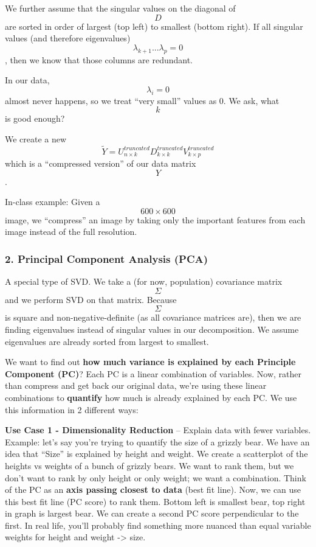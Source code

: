 We further assume that the singular values on the diagonal of \[D\] are
sorted in order of largest (top left) to smallest (bottom right). If all
singular values (and therefore eigenvalues)
\[\lambda_{k + 1}...\lambda_p = 0\], then we know that those columns are
redundant.

In our data, \[\lambda_i = 0\] almost never happens, so we treat ``very
small'' values as 0. We ask, what \[k\] is good enough?

We create a new
\[\tilde{Y} = U_{n \times k}^{truncated} D_{k \times k}^{truncated} V_{k \times p}^{truncated}\]
which is a ``compressed version'' of our data matrix \[Y\].

In-class example: Given a \[600 \times 600\] image, we ``compress'' an
image by taking only the important features from each image instead of
the full resolution.

\hypertarget{principal-component-analysis-pca}{%
\subsubsection{2. Principal Component Analysis
(PCA)}\label{principal-component-analysis-pca}}

A special type of SVD. We take a (for now, population) covariance matrix
\[\Sigma\] and we perform SVD on that matrix. Because \[\Sigma\] is
square and non-negative-definite (as all covariance matrices are), then
we are finding eigenvalues instead of singular values in our
decomposition. We assume eigenvalues are already sorted from largest to
smallest.

We want to find out \textbf{how much variance is explained by each
Principle Component (PC)}? Each PC is a linear combination of variables.
Now, rather than compress and get back our original data, we're using
these linear combinations to \textbf{quantify} how much is already
explained by each PC. We use this information in 2 different ways:

\textbf{Use Case 1 - Dimensionality Reduction} -- Explain data with
fewer variables. Example: let's say you're trying to quantify the size
of a grizzly bear. We have an idea that ``Size'' is explained by height
and weight. We create a scatterplot of the heights vs weights of a bunch
of grizzly bears. We want to rank them, but we don't want to rank by
only height or only weight; we want a combination. Think of the PC as an
\textbf{axis passing closest to data} (best fit line). Now, we can use
this best fit line (PC score) to rank them. Bottom left is smallest
bear, top right in graph is largest bear. We can create a second PC
score perpendicular to the first. In real life, you'll probably find
something more nuanced than equal variable weights for height and weight
-\textgreater{} size.

